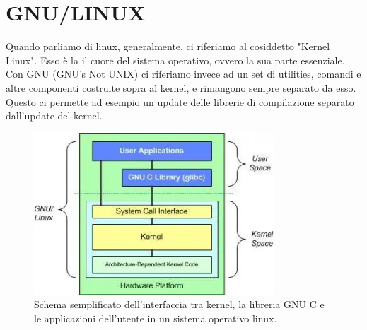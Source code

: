 \documentclass[11pt]{book}
\begin{document}
\section{GNU/LINUX}
Quando parliamo di linux, generalmente, ci riferiamo al cosiddetto "Kernel Linux". Esso è la il cuore del sistema operativo, ovvero la sua parte essenziale. Con GNU (GNU's Not UNIX) ci riferiamo invece ad un set di utilities, comandi e altre componenti costruite sopra al kernel, e rimangono sempre separato da esso. Questo ci permette ad esempio un update delle librerie di compilazione separato dall'update del kernel. 
\begin{figure}
\centering
\includegraphics[width=0.8\textwidth]{img/core_gnu_linux.png}
\caption{Schema semplificato dell'interfaccia tra kernel, la libreria GNU C e le applicazioni dell'utente in un sistema operativo linux.}
\label{linux_core}
\end{figure}
\end{document}
